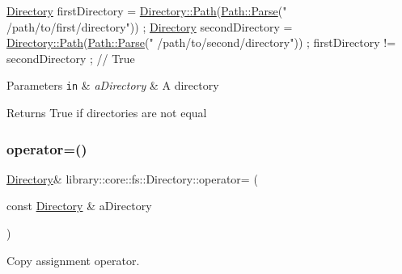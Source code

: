 \begin{DoxyCode}
\hyperlink{classlibrary_1_1core_1_1fs_1_1_directory_a3ec39f6cad19a81d520e9a1f2d8bb1f7}{Directory} firstDirectory = \hyperlink{classlibrary_1_1core_1_1fs_1_1_directory_ae906e33e4659219cf296dd314c7726b8}{Directory::Path}(\hyperlink{classlibrary_1_1core_1_1fs_1_1_path_a6ba644b6609507e724c217bf2020f5ae}{Path::Parse}(\textcolor{stringliteral}{"
      /path/to/first/directory"})) ;
\hyperlink{classlibrary_1_1core_1_1fs_1_1_directory_a3ec39f6cad19a81d520e9a1f2d8bb1f7}{Directory} secondDirectory = \hyperlink{classlibrary_1_1core_1_1fs_1_1_directory_ae906e33e4659219cf296dd314c7726b8}{Directory::Path}(\hyperlink{classlibrary_1_1core_1_1fs_1_1_path_a6ba644b6609507e724c217bf2020f5ae}{Path::Parse}(\textcolor{stringliteral}{"
      /path/to/second/directory"})) ;
firstDirectory != secondDirectory ; \textcolor{comment}{// True}
\end{DoxyCode}



\begin{DoxyParams}[1]{Parameters}
\mbox{\tt in}  & {\em a\+Directory} & A directory \\
\hline
\end{DoxyParams}
\begin{DoxyReturn}{Returns}
True if directories are not equal 
\end{DoxyReturn}
\mbox{\label{classlibrary_1_1core_1_1fs_1_1_directory_af96f153ef1f63eef01e948dc98aa129c}} 
\subsubsection{\texorpdfstring{operator=()}{operator=()}}
{\footnotesize\ttfamily \hyperlink{classlibrary_1_1core_1_1fs_1_1_directory}{Directory}\& library\+::core\+::fs\+::\+Directory\+::operator= (\begin{DoxyParamCaption}\item[{const \hyperlink{classlibrary_1_1core_1_1fs_1_1_directory}{Directory} \&}]{a\+Directory }\end{DoxyParamCaption})\hspace{0.3cm}{\ttfamily [default]}}



Copy assignment operator. 


